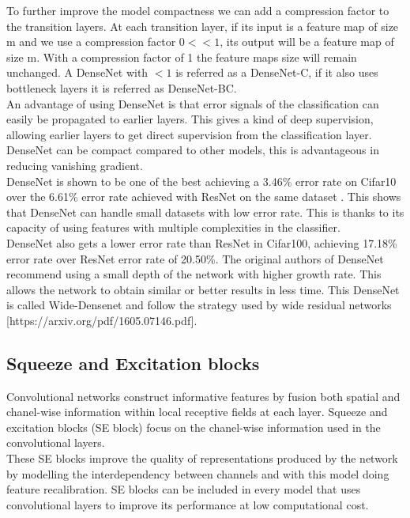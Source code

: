 \documentclass[runningheads,a4paper]{llncs}
\begin{document}
To further improve the model compactness we can add a compression factor to the transition layers. At each transition layer, if its input is a feature map of size m and we use a compression factor $0 << 1$, its output will be a feature map of size m. With a compression factor of 1 the feature maps size will remain unchanged. A DenseNet with $< 1$ is referred as a DenseNet-C, if it also uses bottleneck layers it is referred as  DenseNet-BC. \\

An advantage of using DenseNet is that error signals of the classification can easily be propagated to earlier layers. This gives a kind of deep supervision, allowing earlier layers to get direct supervision from the classification layer. DenseNet can be compact compared to other models, this is advantageous in reducing vanishing gradient. \\

DenseNet is shown to be one of the best achieving a 3.46\% error rate on Cifar10 over the 6.61\% error rate achieved with ResNet on the same dataset \cite{densenet_cifar}. This shows that DenseNet can handle small datasets with low error rate. This is thanks to its capacity of using features with multiple complexities in the classifier. \\

DenseNet also gets a lower error rate than ResNet in Cifar100, achieving 17.18\% error rate over ResNet error rate of 20.50\%.
The original authors of DenseNet recommend using a small depth of the network with higher growth rate. This allows the network to obtain similar or better results in less time. This DenseNet is called Wide-Densenet and follow the strategy used by wide residual networks [https://arxiv.org/pdf/1605.07146.pdf]. 

\subsection{Squeeze and Excitation blocks}

Convolutional networks construct informative features by fusion both spatial and chanel-wise information within local receptive fields at each layer. Squeeze and excitation blocks (SE block) \cite{senet} focus on the chanel-wise information used in the convolutional layers. \\

These SE blocks improve the quality of representations produced by the network by modelling the interdependency between channels and with this model doing feature recalibration. SE blocks can be included in every model that uses convolutional layers to improve its performance at low computational cost.
\end{document}
